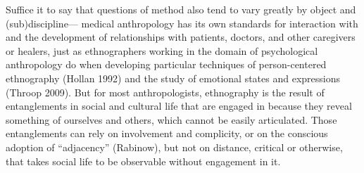 \documentclass[10pt,letter,oneside]{scrartcl}
\let\footnote=\endnote
\begin{document}

  
Suffice it to say that questions of method also tend to vary greatly by object 
and (sub)discipline--- medical anthropology has its own standards for
interaction with and the development of relationships with patients,
doctors, and other caregivers or healers, just as ethnographers working in
the domain of psychological anthropology do when developing particular
techniques of person-centered ethnography (Hollan 1992) and the study of 
emotional states and expressions (Throop 2009). But for most anthropologists, 
ethnography is the result of entanglements in social and cultural life that are 
engaged in because they reveal something of ourselves and others, which
cannot be easily articulated. Those entanglements can rely on involvement 
and complicity, or on the conscious adoption of ``adjacency'' (Rabinow), 
but not on distance, critical or otherwise, that takes social life to be 
observable without engagement in it.
\end{document}
